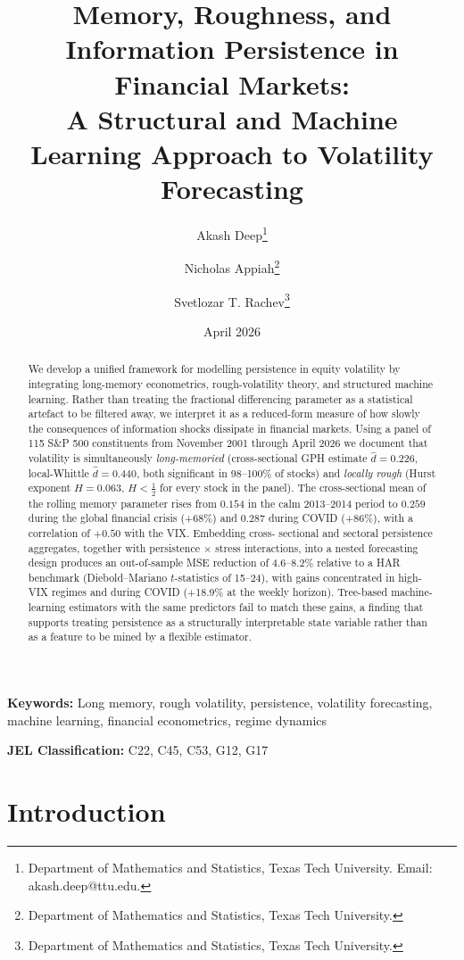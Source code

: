 \documentclass[11pt,a4paper]{article}
\title{\textbf{Memory, Roughness, and Information Persistence in Financial
Markets:\\[3pt] A Structural and Machine Learning Approach to Volatility
Forecasting}}
\author{
Akash Deep\thanks{Department of Mathematics and Statistics, Texas Tech
University. Email: akash.deep@ttu.edu.} \and
Nicholas Appiah\thanks{Department of Mathematics and Statistics, Texas
Tech University.} \and
Svetlozar T. Rachev\thanks{Department of Mathematics and Statistics, Texas
Tech University.}
}
\date{April 2026}
\newcommand{\dhat}{\hat d}
\begin{document}
\maketitle

\begin{abstract}
\noindent We develop a unified framework for modelling persistence in equity
volatility by integrating long-memory econometrics, rough-volatility theory,
and structured machine learning. Rather than treating the fractional
differencing parameter as a statistical artefact to be filtered away, we
interpret it as a reduced-form measure of how slowly the consequences of
information shocks dissipate in financial markets. Using a panel of 115
S\&P 500 constituents from November 2001 through April 2026 we document
that volatility is simultaneously \emph{long-memoried} (cross-sectional GPH
estimate $\dhat = 0.226$, local-Whittle $\dhat = 0.440$, both significant in
98--100\% of stocks) and \emph{locally rough} (Hurst exponent $H = 0.063$,
$H<\tfrac12$ for every stock in the panel). The cross-sectional mean of the
rolling memory parameter rises from $0.154$ in the calm 2013--2014 period to
$0.259$ during the global financial crisis (+68\%) and $0.287$ during COVID
(+86\%), with a correlation of $+0.50$ with the VIX. Embedding cross-
sectional and sectoral persistence aggregates, together with persistence
$\times$ stress interactions, into a nested forecasting design produces an
out-of-sample MSE reduction of 4.6--8.2\% relative to a HAR benchmark
(Diebold--Mariano $t$-statistics of 15--24), with gains concentrated in
high-VIX regimes and during COVID (+18.9\% at the weekly horizon).
Tree-based machine-learning estimators with the same predictors fail to
match these gains, a finding that supports treating persistence as a
structurally interpretable state variable rather than as a feature to be
mined by a flexible estimator.
\end{abstract}

\noindent\textbf{Keywords:} Long memory, rough volatility, persistence,
volatility forecasting, machine learning, financial econometrics, regime
dynamics

\noindent\textbf{JEL Classification:} C22, C45, C53, G12, G17

\newpage
\tableofcontents
\newpage

\section{Introduction}
\label{sec:intro}
\end{document}
